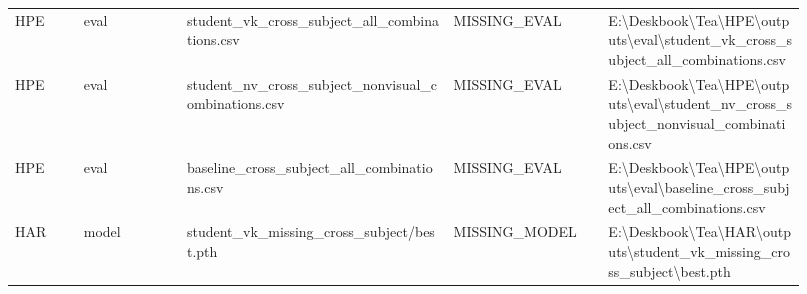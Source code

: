 \begin{longtable}{p{0.08\linewidth}p{0.12\linewidth}p{0.31\linewidth}p{0.18\linewidth}p{0.23\linewidth}}
HPE & eval & student\_vk\_cross\_subject\_all\_combinations.csv & MISSING\_EVAL & \scriptsize E:\textbackslash{}Deskbook\textbackslash{}Tea\textbackslash{}HPE\textbackslash{}outputs\textbackslash{}eval\textbackslash{}student\_vk\_cross\_subject\_all\_combinations.csv\\
HPE & eval & student\_nv\_cross\_subject\_nonvisual\_combinations.csv & MISSING\_EVAL & \scriptsize E:\textbackslash{}Deskbook\textbackslash{}Tea\textbackslash{}HPE\textbackslash{}outputs\textbackslash{}eval\textbackslash{}student\_nv\_cross\_subject\_nonvisual\_combinations.csv\\
HPE & eval & baseline\_cross\_subject\_all\_combinations.csv & MISSING\_EVAL & \scriptsize E:\textbackslash{}Deskbook\textbackslash{}Tea\textbackslash{}HPE\textbackslash{}outputs\textbackslash{}eval\textbackslash{}baseline\_cross\_subject\_all\_combinations.csv\\
HAR & model & student\_vk\_missing\_cross\_subject/best.pth & MISSING\_MODEL & \scriptsize E:\textbackslash{}Deskbook\textbackslash{}Tea\textbackslash{}HAR\textbackslash{}outputs\textbackslash{}student\_vk\_missing\_cross\_subject\textbackslash{}best.pth\\
\bottomrule
\end{longtable}
